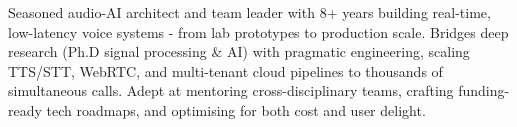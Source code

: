 \documentclass[9pt,a4paper,ragged2e]{altacv}
\begin{document}


\begin{fullwidth}
\makecvheader
\end{fullwidth}


Seasoned audio-AI architect and team leader with 8+ years building real-time, low-latency voice systems - from lab prototypes to production scale. Bridges deep research (Ph.D signal processing \& AI) with pragmatic engineering, scaling TTS/STT, WebRTC, and multi-tenant cloud pipelines to thousands of simultaneous calls. Adept at mentoring cross-disciplinary teams, crafting funding-ready tech roadmaps, and optimising for both cost and user delight.

\vspace{4pt}
\end{document}
